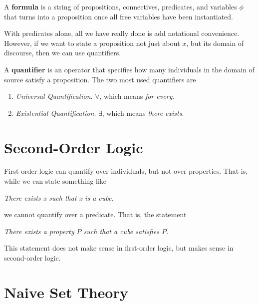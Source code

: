 \documentclass{article}
\begin{document}
  \begin{definition}[Formula]
    A \textbf{formula} is a string of propositions, connectives, predicates, and variables $\phi$ that turns into a proposition once all free variables have been instantiated. 
  \end{definition}

  With predicates alone, all we have really done is add notational convenience. However, if we want to state a proposition not just about $x$, but its domain of discourse, then we can use quantifiers. 

  \begin{definition}[Quantifier]
    A \textbf{quantifier} is an operator that specifies how many individuals in the domain of source satisfy a proposition. The two most used quantifiers are 
    \begin{enumerate}
      \item \textit{Universal Quantification}. $\forall$, which means \textit{for every}. 
      \item \textit{Existential Quantification}. $\exists$, which means \textit{there exists}. 
    \end{enumerate}
  \end{definition}

\section{Second-Order Logic} 

  First order logic can quantify over individuals, but not over properties. That is, while we can state something like 

  \begin{center}
    \textit{There exists x such that x is a cube.}
  \end{center} 

  we cannot quantify over a predicate. That is, the statement 
  
  \begin{center}
    \textit{There exists a property $P$ such that a cube satisfies $P$.}
  \end{center}

  This statement does not make sense in first-order logic, but makes sense in second-order logic. 
  
\section{Naive Set Theory}
\end{document}
